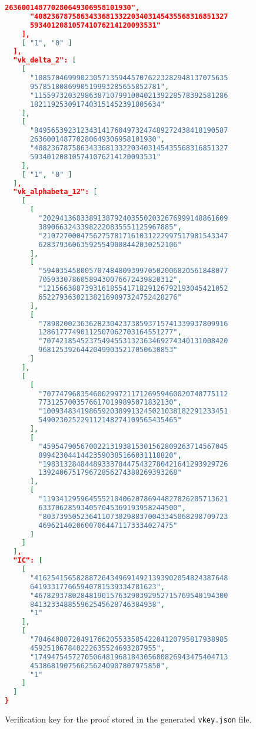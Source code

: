 \documentclass[../lecture-notes.tex]{subfiles}
\begin{document}
\begin{figure}
\begin{center}
\begin{tcolorbox}
\begin{lstlisting}[language=JSON,numbers=none,basicstyle=\footnotesize\ttfamily\tiny]
      263600148770280649306958101930",
      "4082367875863433681332203403145435568316851327
      593401208105741076214120093531"
    ],
    [ "1", "0" ]
  ],
  "vk_delta_2": [
    [
      "1085704699902305713594457076223282948137075635
      9578518086990519993285655852781",
      "1155973203298638710799100402139228578392581286
      1821192530917403151452391805634"
    ],
    [
      "8495653923123431417604973247489272438418190587
      263600148770280649306958101930",
      "4082367875863433681332203403145435568316851327
      593401208105741076214120093531"
    ],
    [ "1", "0" ]
  ],
  "vk_alphabeta_12": [
    [
      [
        "20294136833891387924035502032676999148861609
        38906632433982220835551125967885",
        "21072700047562757817161031222997517981543347
        628379360635925549008442030252106"
      ],
      [
        "59403545800570748480939970502006820561848077
        70593307860589430076672439820312",
        "12156638873931618554171829126792193045421052
        652279363021382169897324752428276"
      ],
      [
        "78982002363628230423738593715741339937809916
        12861777490112507062703164551277",
        "70742185452375494553132363469274340131008420
        96812539264420499035217050630853"
      ]
    ],
    [
      [
        "70774796835460029972117126959460020748775112
        77312570035766170199895071832130",
        "10093483419865920389913245021038182291233451
        549023025229112148274109565435465"
      ],
      [
        "45954790567002213193815301562809263714567045
        09942304414423590385166031118820",
        "19831328484489333784475432780421641293929726
        139240675179672856274388269393268"
      ],
      [
        "11934129596455521040620786944827826205713621
        633706285934057045369193958244500",
        "80373950523641107302988370043345068298709723
        46962140206007064471173334027475"
      ]
    ]
  ],
  "IC": [
    [
      "4162541565828872643496914921393902054824387648
      641933177665940781539334781623",
      "4678293780284819015763290392952715769540194300
      841323348855962545628746384938",
      "1"
    ],
    [
      "7846408072049176620553358542204120795817938985
      459251067840222635524693287955",
      "1749475457270506481968184305680826943475404713
      4538681907566256240907807975850",
      "1"
    ]
  ]
}
                \end{lstlisting}
            \end{tcolorbox}
        \end{center}
        \caption{Verification key for the proof stored in the generated \texttt{vkey.json} file.}
        \label{fig:vkey-json}
    \end{figure}
\end{document}
